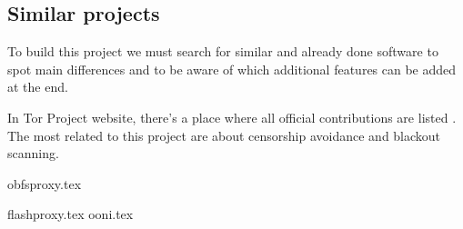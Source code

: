\subsection{Similar projects}
To build this project we must search for similar and already done software to spot main differences and to be aware of which additional features can be added at the end.

In Tor Project website, there's a place where all official contributions are listed \cite{TorWebVol}. The most related to this project are about censorship avoidance and blackout scanning.

{obfsproxy.tex}

\pagebreak
{flashproxy.tex}
{ooni.tex}
